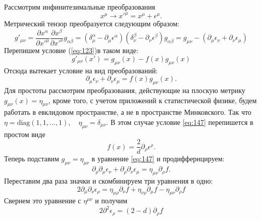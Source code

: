 \documentclass[a4paper,12pt]{article}
\theoremstyle{definition}
\theoremstyle{definition}
\theoremstyle{definition}
\begin{document}
Рассмотрим инфинитезимальные преобразования
\begin{equation}
  \label{eq:144}
  x^{\mu}\to x'^{\mu}=x^{\mu}+\epsilon^{\mu}.
\end{equation}
Метрический тензор преобразуется следующим образом:
\begin{equation}
  \label{eq:145}
  g'_{\mu\nu}=\frac{\partial x^{\alpha}}{\partial x'^{\mu}}\frac{\partial x^{\beta}}{\partial x'^{\nu}} g_{\alpha\beta}=(\delta^{\alpha}_{\mu}-\partial_{\mu}\epsilon^{\alpha})(\delta^{\beta}_{\nu}-\partial_{\nu} \epsilon^{\beta})g_{\alpha\beta}=g_{\mu\nu}-(\partial_{\mu}\epsilon_{\nu}+\partial_{\nu}\epsilon_{\mu})
\end{equation}
Перепишем условие (\ref{eq:123})в таком виде:
\begin{equation}
  \label{eq:146}
  g'_{\mu\nu}(x')=g_{\mu\nu}(x)-f(x)g_{\mu\nu}(x)
\end{equation}
Отсюда вытекает условие на вид преобразований:
\begin{equation}
  \label{eq:147}
  \partial_{\mu}\epsilon_{\nu}+\partial_{\nu}\epsilon_{\mu}=f(x)g_{\mu\nu}(x).
\end{equation}
Для простоты рассмотрим преобразования, действующие на плоскую метрику $g_{\mu\nu}(x)=\eta_{\mu\nu}$, кроме того, с учетом приложений к статистической физике, будем работать в евклидовом пространстве, а не в пространстве Минковского. Так что $\eta=\mathrm{diag}(1,1,\dots,1),\quad \eta_{\mu\nu}=\delta_{\mu\nu}$. В этом случае условие \eqref{eq:147} перепишется в простом виде
\begin{equation}
  \label{eq:148}
  f(x)=\frac{2}{d}\partial_{\rho}\epsilon^{\rho}.
\end{equation}
Теперь подставим $g_{\mu\nu}=\eta_{\mu\nu}$ в уравнение \eqref{eq:147} и продиффернцируем:
\begin{equation}
  \label{eq:149}
  \partial_{\rho} \partial_{\mu}\epsilon_{\nu}+\partial_{\rho}\partial_{\nu}\epsilon_{\mu}=\eta_{\mu\nu}\partial_{\rho} f.
\end{equation}
Переставим два раза значки и скомбинируем три уравнения в одно:
\begin{equation}
  \label{eq:150}
  2\partial_{\mu}\partial_{\nu}\epsilon_{\rho}=\eta_{\mu\rho}\partial_{\nu} f+\eta_{\nu\rho}\partial_{\mu}f-\eta_{\mu\nu}\partial_{\rho}f
\end{equation}
Свернем это уравнение с $\eta^{\mu\nu}$ и получим
\begin{equation}
  \label{eq:151}
  2\partial^2 \epsilon_{\rho}=(2-d)\partial_{\rho}f
\end{equation}
\end{document}
